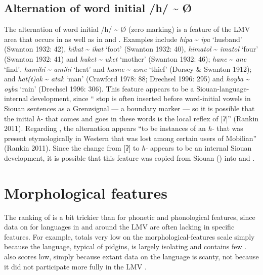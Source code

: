 \documentclass[output=paper]{LSP/langsci}
\begin{document}
\subsection{Alternation of word initial /h/ \textasciitilde{} Ø}

The alternation of word initial /h/ \textasciitilde{} Ø (zero marking) is a feature of the LMV area that occurs in  as well as in  and . Examples include  \emph{hipa} \textasciitilde{} \emph{ipa} `husband' (Swanton 1932: 42), \emph{hikat} \textasciitilde{} \emph{ikat} `foot' (Swanton 1932: 40), \emph{himatol} \textasciitilde{} \emph{imatol} `four' (Swanton 1932: 41) and \emph{huket} \textasciitilde{} \emph{uket} `mother' (Swanton 1932: 46);  \emph{hane} \textasciitilde{} \emph{ane} `find', \emph{hamihi} \textasciitilde{} \emph{amihi} `heat' and \emph{hasne} \textasciitilde{} \emph{asne} `thief' (Dorsey \& Swanton 1912); and  \emph{hat(t)ak} \textasciitilde{} \emph{atak} `man' (Crawford 1978: 88; Drechsel 1996: 295) and \emph{hoyba} \textasciitilde{} \emph{oyba} `rain' (Drechsel 1996: 306). This feature appears to be a Siouan-language-internal development, since “ stop is often inserted before word-initial vowels in Siouan sentences as a Grenzsignal — a boundary marker — so it is possible that the  initial \emph{h-} that comes and goes in these words is the local reflex of [ʔ]”  (Rankin 2011). Regarding , the alternation appears “to be instances of an \emph{h-} that was present etymologically in Western  that was lost among certain users of Mobilian” (Rankin 2011). Since the change from [ʔ] to \emph{h-} appears to be an internal Siouan development, it is possible that this feature was copied from Siouan () into  and . 

\section{Morphological features}

The ranking of  is a bit trickier than for phonetic and phonological features, since data on  for languages in and around the LMV are often lacking in specific features. For example,  totals very low on the morphological-features scale simply because the language, typical of pidgins, is largely isolating and contains few .  also scores low, simply because extant data on the language is scanty, not because it did not participate more fully in the LMV .
\end{document}
